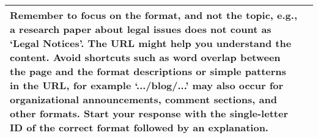 \begin{table}[!ht]
\begin{tabular}{lp{}}
Remember to focus on the format, and not the topic, e.g., a research paper about legal issues does not count as `Legal Notices'.
The URL might help you understand the content. Avoid shortcuts such as word overlap between the page and the format descriptions or simple patterns in the URL, for example `.../blog/...' may also occur for organizational announcements, comment sections, and other formats.
Start your response with the single-letter ID of the correct format followed by an explanation. \\
\bottomrule
\end{tabular}
    \icmlskip{-0.1in}
    \label{tab:templates}
\end{table}
